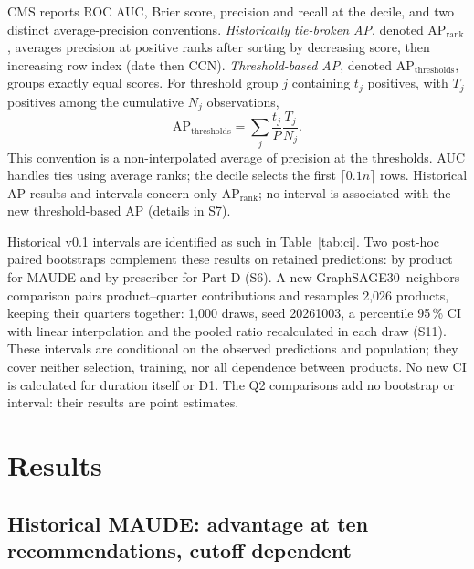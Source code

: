 CMS reports ROC AUC, Brier score, precision and recall at the decile, and two distinct average-precision conventions. \emph{Historically tie-broken AP}, denoted $\mathrm{AP}_{\mathrm{rank}}$, averages precision at positive ranks after sorting by decreasing score, then increasing row index (date then CCN). \emph{Threshold-based AP}, denoted $\mathrm{AP}_{\mathrm{thresholds}}$, groups exactly equal scores. For threshold group $j$ containing $t_j$ positives, with $T_j$ positives among the cumulative $N_j$ observations,
\begin{equation}
 \mathrm{AP}_{\mathrm{thresholds}}=\sum_j\frac{t_j}{P}\frac{T_j}{N_j}.
\end{equation}
This convention is a non-interpolated average of precision at the thresholds\cite{sklearnap}. AUC handles ties using average ranks; the decile selects the first $\lceil0.1n\rceil$ rows. Historical AP results and intervals concern only $\mathrm{AP}_{\mathrm{rank}}$; no interval is associated with the new threshold-based AP (details in S7).

Historical v0.1 intervals are identified as such in Table~\ref{tab:ci}. Two post-hoc paired bootstraps complement these results on retained predictions: by product for MAUDE and by prescriber for Part D (S6). A new GraphSAGE30--neighbors comparison pairs product--quarter contributions and resamples 2,026 products, keeping their quarters together: 1,000 draws, seed 20261003, a percentile 95\,\% CI with linear interpolation and the pooled ratio recalculated in each draw (S11). These intervals are conditional on the observed predictions and population; they cover neither selection, training, nor all dependence between products. No new CI is calculated for duration itself or D1. The Q2 comparisons add no bootstrap or interval: their results are point estimates.


\section{Results}

\subsection{Historical MAUDE: advantage at ten recommendations, cutoff dependent}

\begin{table}[!htbp]
\centering\small
\caption{Historical MAUDE v0.1 results, 2024Q1--2025Q4 test, prior product-report support $\geq1$. GraphSAGE here denotes the historical three-epoch configuration, not GraphSAGE30. R@K: micro recall. Bold indicates the highest point estimate among historical models in each column, without an additional superiority test. Source: unified table\cite{hgbresults}.}
\label{tab:maude}

\end{table}

